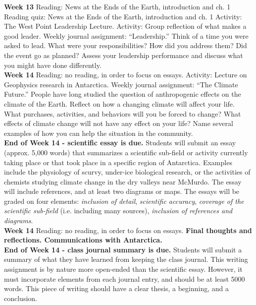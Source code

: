 \documentclass[10pt]{article}
\begin{document}
\begin{outline}[enumerate]
\1 \textbf{Week 13}
\2 Reading: News at the Ends of the Earth, introduction and ch. 1
\2 Reading quiz: News at the Ends of the Earth, introduction and ch. 1
\2 Activity: The West Point Leadership Lecture.
\2 Activity: Group reflection of what makes a good leader.
\2 Weekly journal assignment: ``Leadership.'' Think of a time you were asked to lead.  What were your responsibilities?  How did you address them?  Did the event go as planned?  Assess your leadership performance and discuss what you might have done differently. \\
\1 \textbf{Week 14}
\2 Reading: no reading, in order to focus on essays.
\2 Activity: Lecture on Geophysics research in Antarctica.
\2 Weekly journal assignment: ``The Climate Future.'' People have long studied the question of anthropogenic effects on the climate of the Earth.  Reflect on how a changing climate will affect your life.  What purchases, activities, and behaviors will you be forced to change?  What effects of climate change will not have any effect on your life?  Name several examples of how you can help the situation in the community. \\
\1 \textbf{End of Week 14 - scientific essay is due.} Students will submit an essay (approx. 5,000 words) that summarizes a scientific sub-field or activity currently taking place or that took place in a specific region of Antarctica.  Examples include the physiology of scurvy, under-ice biological research, or the activities of chemists studying climate change in the dry valleys near McMurdo.  The essay will include references, and at least two diagrams or maps.  The essays will be graded on four elements: \textit{inclusion of detail}, \textit{scientific accuracy}, \textit{coverage of the scientific sub-field} (i.e. including many sources), \textit{inclusion of references and diagrams}. \\
\1 \textbf{Week 14}
\2 Reading: no reading, in order to focus on essays.
\2 \textbf{Final thoughts and reflections.  Communications with Antarctica.} \\
\1 \textbf{End of Week 14 - class journal summary is due.} Students will submit a summary of what they have learned from keeping the class journal.  This writing assignment is by nature more open-ended than the scientific essay.  However, it must incorporate elements from each journal entry, and should be at least 5000 words.  This piece of writing should have a clear thesis, a beginning, and a conclusion.
\end{outline}
\end{document}
